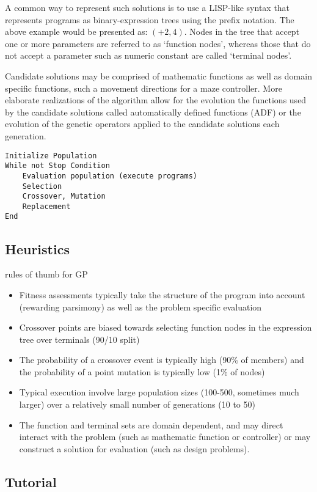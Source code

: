 A common way to represent such solutions is to use a LISP-like syntax that represents programs as binary-expression trees using the prefix notation. The above example would be presented as: $(+ 2,4)$. Nodes in the tree that accept one or more parameters are referred to as `function nodes', whereas those that do not accept a parameter such as numeric constant are called `terminal nodes'.

Candidate solutions may be comprised of mathematic functions as well as domain specific functions, such a movement directions for a maze controller. More elaborate realizations of the algorithm allow for the evolution the functions used by the candidate solutions called automatically defined functions (ADF) or the evolution of the genetic operators applied to the candidate solutions each generation.

\begin{lstlisting}
Initialize Population
While not Stop Condition
	Evaluation population (execute programs)
	Selection
	Crossover, Mutation
	Replacement
End
\end{lstlisting}

\subsection{Heuristics}
rules of thumb for GP

\begin{itemize}
	\item Fitness assessments typically take the structure of the program into account (rewarding parsimony) as well as the problem specific evaluation
	\item Crossover points are biased towards selecting function nodes in the expression tree over terminals (90/10 split)
	\item The probability of a crossover event is typically high (90\% of members) and the probability of a point mutation is typically low (1\% of nodes)
	\item Typical execution involve large population sizes (100-500, sometimes much larger) over a relatively small number of generations (10 to 50)
	\item The function and terminal sets are domain dependent, and may direct interact with the problem (such as mathematic function or controller) or may construct a solution for evaluation (such as design problems).
\end{itemize}

\subsection{Tutorial}
